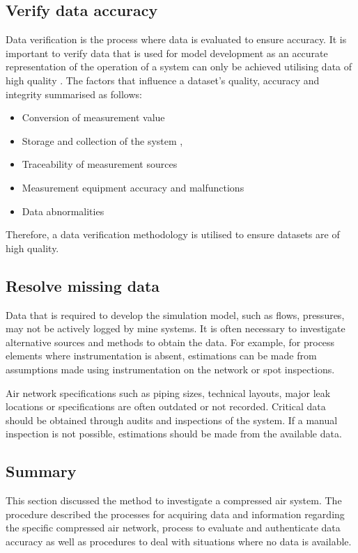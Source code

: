	\subsection{Verify data accuracy}
	Data verification is the process where data is evaluated to ensure accuracy. It is important to verify data that is used for model development as an accurate representation of the operation of a system can only be achieved utilising data of high quality \cite{gous2016data}. The factors that influence a dataset's quality, accuracy and integrity summarised as follows:
	\begin{itemize}
		\item Conversion of measurement value \cite{meijsen2015verification}
		\item Storage and collection of the system \cite{vanNiekerk2016quantification},\cite{Jansevan2016structuring}
		\item Traceability of measurement sources \cite{Jansevan2016structuring}
		\item Measurement equipment accuracy and malfunctions \cite{gous2016data}
		\item Data abnormalities \cite{gous2016data}
	\end{itemize} 
	\par 
	Therefore, a data verification methodology is utilised to ensure datasets are of high quality. 
	\subsection{Resolve missing data}
		Data that is required to develop the simulation model, such as flows, pressures, may not be actively logged by mine systems. It is often necessary to investigate alternative sources and methods to obtain the data. For example, for process elements where instrumentation is absent, estimations can be made from assumptions made using instrumentation on the network or spot inspections.
		\par 
		Air network specifications such as piping sizes, technical layouts, major leak locations or specifications are often outdated or not recorded. Critical data should be obtained through audits and inspections of the system. If a manual inspection is not possible, estimations should be made from the available data. %
	
	\subsection{Summary}	
	This section discussed the method to investigate a compressed air system. The procedure described the processes for acquiring data and information regarding the specific compressed air network, process to evaluate and authenticate data accuracy as well as procedures to deal with situations where no data is available.
